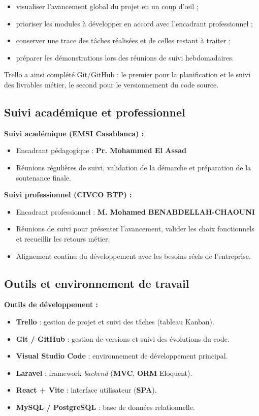 \begin{itemize}
  \item visualiser l'avancement global du projet en un coup d'œil ;
  \item prioriser les modules à développer en accord avec l'encadrant professionnel ;
  \item conserver une trace des tâches réalisées et de celles restant à traiter ;
  \item préparer les démonstrations lors des réunions de suivi hebdomadaires.
\end{itemize}

Trello a ainsi complété Git/GitHub : le premier pour la planification et le suivi
des livrables métier, le second pour le versionnement du code source.

\subsection{Suivi académique et professionnel}

\textbf{Suivi académique (EMSI Casablanca) :}
\begin{itemize}
  \item Encadrant pédagogique : \textbf{Pr. Mohammed El Assad}
  \item Réunions régulières de suivi, validation de la démarche et préparation de la
  soutenance finale.
\end{itemize}

\textbf{Suivi professionnel (CIVCO BTP) :}
\begin{itemize}
  \item Encadrant professionnel : \textbf{M. Mohamed BENABDELLAH-CHAOUNI}
  \item Réunions de suivi pour présenter l'avancement, valider les choix fonctionnels et
  recueillir les retours métier.
  \item Alignement continu du développement avec les besoins réels de l'entreprise.
\end{itemize}

\subsection{Outils et environnement de travail}

\textbf{Outils de développement :}
\begin{itemize}
  \item \textbf{Trello} : gestion de projet et suivi des tâches (tableau Kanban).
  \item \textbf{Git / GitHub} : gestion de versions et suivi des évolutions du code.
  \item \textbf{Visual Studio Code} : environnement de développement principal.
  \item \textbf{Laravel} : framework \textit{backend} (\textbf{MVC}, \textbf{ORM} Eloquent).
  \item \textbf{React + Vite} : interface utilisateur (\textbf{SPA}).
  \item \textbf{MySQL / PostgreSQL} : base de données relationnelle.
\end{itemize}

